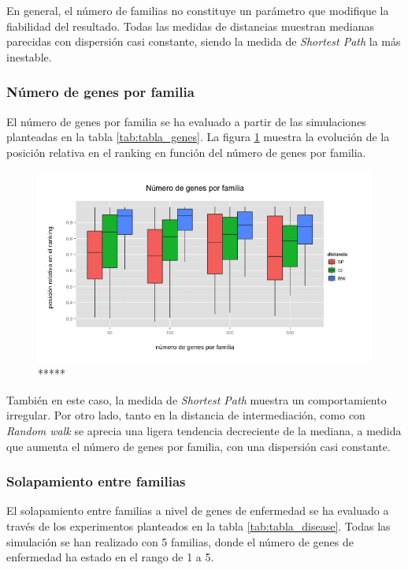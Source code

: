 \medskip
En general, el número de familias no constituye un parámetro que modifique la fiabilidad del resultado. Todas las medidas de distancias muestran  medianas parecidas con dispersión casi constante, siendo la medida de \emph{Shortest Path} la más inestable.
 

\subsubsection{Número de genes por familia}

El número de genes por familia se ha evaluado a partir de las simulaciones planteadas en la tabla \ref{tab:tabla_genes}. La figura \ref{fig:genes} muestra la evolución de la posición relativa en el ranking en función del número de genes por familia.

\begin{figure}[H]
\centering
\includegraphics[scale=0.5]{images/tabla_genes.png}
\caption{*****}
\label{fig:genes} 
\end{figure}

\medskip
También en este caso, la medida de \emph{Shortest Path} muestra un comportamiento irregular. Por otro lado, tanto en la distancia de intermediación, como con \emph{Random walk} se aprecia una ligera tendencia decreciente de la mediana, a medida que aumenta el número de genes por familia, con una dispersión casi constante.

\subsubsection{Solapamiento entre familias}

El solapamiento entre familias a nivel de genes de enfermedad se ha evaluado a través de los experimentos planteados en la tabla \ref{tab:tabla_disease}. Todas las simulación se han realizado con 5 familias, donde el número de genes de enfermedad ha estado en el rango de 1 a 5. 

